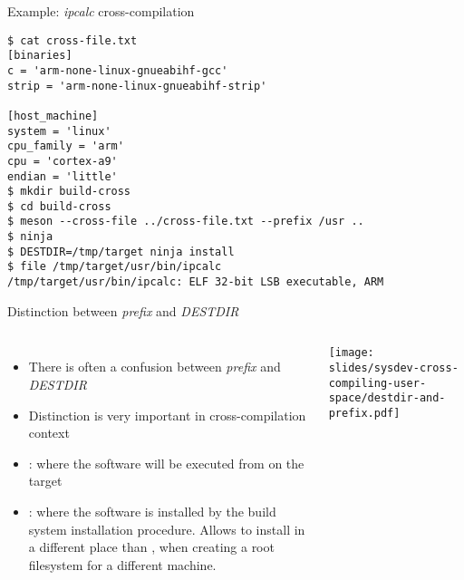 \begin{frame}[fragile]{Example: {\em ipcalc} cross-compilation}
    \begin{block}{}
      {\tiny
\begin{verbatim}
$ cat cross-file.txt
[binaries]
c = 'arm-none-linux-gnueabihf-gcc'
strip = 'arm-none-linux-gnueabihf-strip'

[host_machine]
system = 'linux'
cpu_family = 'arm'
cpu = 'cortex-a9'
endian = 'little'
$ mkdir build-cross
$ cd build-cross
$ meson --cross-file ../cross-file.txt --prefix /usr ..
$ ninja
$ DESTDIR=/tmp/target ninja install
$ file /tmp/target/usr/bin/ipcalc
/tmp/target/usr/bin/ipcalc: ELF 32-bit LSB executable, ARM
\end{verbatim}
      }
    \end{block}
\end{frame}

\begin{frame}{Distinction between {\em prefix} and {\em DESTDIR}}
  \begin{columns}
    \begin{itemize}
    \item There is often a confusion between {\em prefix} and {\em
        DESTDIR}
    \item Distinction is very important in cross-compilation context
    \item {}: where the software will be executed from on the
      target
    \item {}: where the software is installed by the build
      system installation procedure. Allows to install in a different
      place than , when creating a root filesystem for a
      different machine.
    \end{itemize}
    \texttt{[image: slides/sysdev-cross-compiling-user-space/destdir-and-prefix.pdf]}
  \end{columns}
\end{frame}

